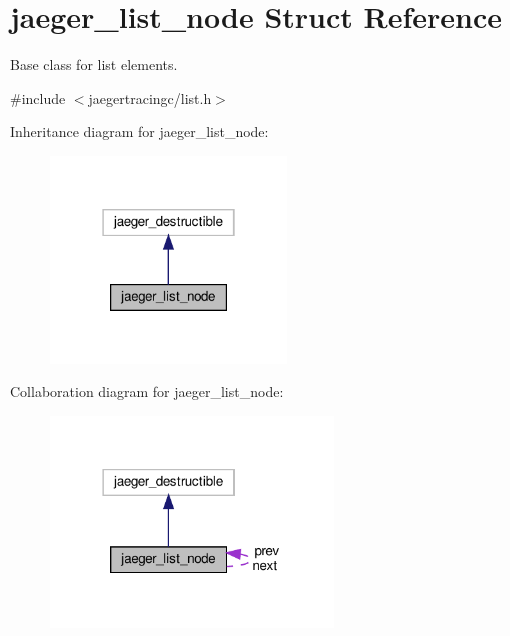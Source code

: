 \hypertarget{structjaeger__list__node}{}\section{jaeger\+\_\+list\+\_\+node Struct Reference}
\label{structjaeger__list__node}


Base class for list elements.  




{\ttfamily \#include $<$jaegertracingc/list.\+h$>$}



Inheritance diagram for jaeger\+\_\+list\+\_\+node\+:\nopagebreak
\begin{figure}[H]
\begin{center}
\leavevmode
\includegraphics[width=178pt]{structjaeger__list__node__inherit__graph}
\end{center}
\end{figure}


Collaboration diagram for jaeger\+\_\+list\+\_\+node\+:\nopagebreak
\begin{figure}[H]
\begin{center}
\leavevmode
\includegraphics[width=213pt]{structjaeger__list__node__coll__graph}
\end{center}
\end{figure}
